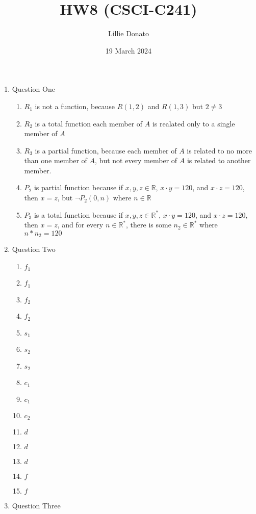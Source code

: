 \documentclass{article}
\title{HW8 (CSCI-C241)}
\author{Lillie Donato}
\date{19 March 2024}
\begin{document}
\maketitle

\begin{enumerate}
    \item Question One
    \begin{enumerate}
        \item $R_1$ is not a function, because $R(1, 2)$ and $R(1, 3)$ but $2 \neq 3$
        \item $R_2$ is a total function each member of $A$ is realated only to a single member of $A$
        \item $R_3$ is a partial function, because each member of $A$ is related to no more than one member of $A$, but not every member of $A$ is related to another member.
        \item $P_2$ is partial function because if $x,y,z \in \mathbb{R}$, $x \cdot y=120$, and $x \cdot z = 120$, then $x = z$, but $\neg P_2(0, n)$ where $n \in \mathbb{R}$
        \item $P_3$ is a total function because if $x,y,z \in \mathbb{R}^*$, $x \cdot y=120$, and $x \cdot z = 120$, then $x = z$, and for every $n \in \mathbb{R}^*$, there is some $n_2 \in \mathbb{R}^*$ where $n*n_2 = 120$
    \end{enumerate}
    \item Question Two
    \begin{enumerate}
        \item $f_1$
        \item $f_1$
        \item $f_2$
        \item $f_2$
        \item $s_1$
        \item $s_2$
        \item $s_2$
        \item $c_1$
        \item $c_1$
        \item $c_2$
        \item $d$
        \item $d$
        \item $d$
        \item $f$
        \item $f$
    \end{enumerate}
    \item Question Three
    \begin{enumerate}

\end{enumerate}
\end{enumerate}
\end{document}
